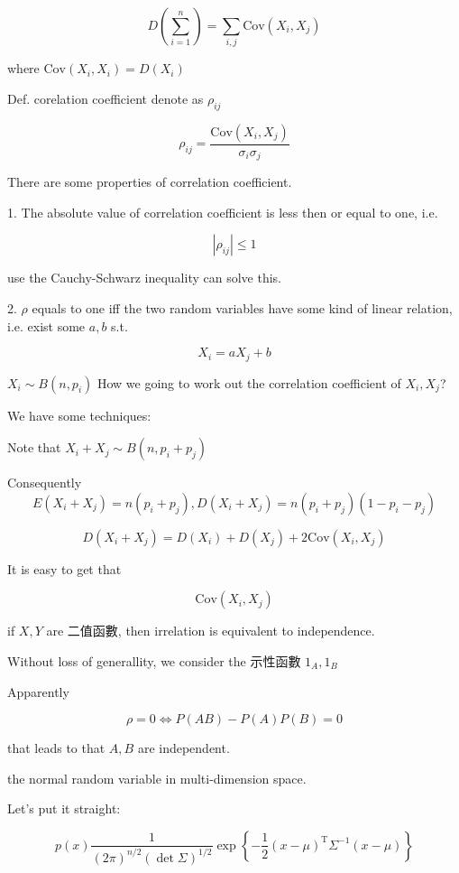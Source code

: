 \documentclass[a4paper, 10pt]{ctexart} %
\begin{document}
 $$D \left(\sum_{i=1} ^{n}\right) = \sum_{i, j} \mathrm{Cov} \left(X_{i}, X_{j}\right)$$

 where $\mathrm{Cov} \left(X _{i} , X_{i}\right) = D \left(X_{i}\right)$

 Def. corelation coefficient denote as $\rho_{ij}$

 $$\rho_{ij} = \frac{\mathrm{Cov} \left(X_{i}, X_{j}\right)}{\sigma _{i} \sigma_{j}}$$

 There are some properties of correlation coefficient. 

 1. The absolute value of correlation coefficient is less then or equal to one, i.e.

 $$\left| \rho_{ij} \right|  \le 1$$

 use the Cauchy-Schwarz inequality can solve this.

 2. $\rho  $ equals to one iff the two random variables have some kind of linear relation, i.e. exist some $a, b$ s.t.

 $$X_{i} = a X_{j} + b$$

 $X_{i} \sim B \left(  n , p_{i}\right)$ How we going to work out the correlation coefficient of $X_{i} , X_{j}$?

 We have some techniques:

 Note that $X_{i} + X_{j} \sim B \left( n , p_{i} + p_{j}\right)$

 Consequently
 $$E \left(X_{i} + X_{j}\right)=  n \left( p_{i} + p_{j}\right), D \left(X_{i}  + X_{j}\right) = n \left(p_{i} + p_{j}\right) \left(1 - p_{i} - p_{j}\right)$$

 $$D \left(X_{i} + X_{j}\right)  = D \left(X_{i}\right) + D \left(X_{j} \right) + 2\mathrm{Cov} \left(X_{i}, X_{j}\right)$$

 It is easy to get that 

 $$\mathrm{Cov} \left(X_{i} , X_{j}\right)$$


 if $X, Y$ are 二值函數, then irrelation is equivalent to independence. 

 Without loss of generallity, we consider the 示性函數 $1_{A}, 1 _{B}$

 Apparently

 $$\rho = 0 \iff P\left(A B \right) - P\left(A \right) P\left(B\right) = 0 $$

 that leads to that $A, B$ are independent. 

 the normal random variable in multi-dimension space. 

 Let's put it straight:

 $$ p \left(x\right) \frac{1}{\left(2\pi\right) ^{n /2} \left(\det \Sigma \right)^{1 /2}} \exp \left\{-\frac{1}{2} \left(x - \mu\right) ^{\mathrm{T}} \Sigma ^{-1} \left(x - \mu\right) \right\}$$
\end{document}
